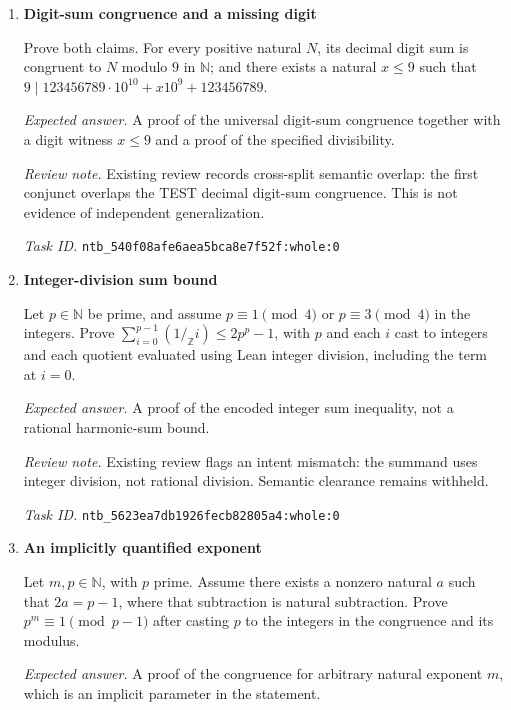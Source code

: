 \documentclass[11pt]{article}
\newcommand{\pth}[1]{\nolinkurl{#1}}
\begin{document}
\begin{enumerate}[label={DEV \arabic*.},leftmargin=4.5em,itemsep=1em]
\emph{Expected answer.} A proof of the integer congruence $p^n\equiv1\pmod{p-1}$ under the prime, exponent, and existential assumptions.

\emph{Task ID.} \pth{ntb_4678ae628e2cd00da60bb8e9:whole:0}

\item \textbf{Digit-sum congruence and a missing digit}\label{qn:dev:13}

Prove both claims. For every positive natural $N$, its decimal digit sum is congruent to $N$ modulo $9$ in $\mathbb N$; and there exists a natural $x\le9$ such that $9\mid123456789\cdot10^{10}+x10^9+123456789$.

\emph{Expected answer.} A proof of the universal digit-sum congruence together with a digit witness $x\le9$ and a proof of the specified divisibility.

\emph{Review note.} Existing review records cross-split semantic overlap: the first conjunct overlaps the TEST decimal digit-sum congruence. This is not evidence of independent generalization.

\emph{Task ID.} \pth{ntb_540f08afe6aea5bca8e7f52f:whole:0}

\item \textbf{Integer-division sum bound}\label{qn:dev:14}

Let $p\in\mathbb N$ be prime, and assume $p\equiv1\pmod4$ or $p\equiv3\pmod4$ in the integers. Prove $\sum_{i=0}^{p-1}(1\mathbin{/_{\mathbb Z}}i)\le2p^p-1$, with $p$ and each $i$ cast to integers and each quotient evaluated using Lean integer division, including the term at $i=0$.

\emph{Expected answer.} A proof of the encoded integer sum inequality, not a rational harmonic-sum bound.

\emph{Review note.} Existing review flags an intent mismatch: the summand uses integer division, not rational division. Semantic clearance remains withheld.

\emph{Task ID.} \pth{ntb_5623ea7db1926fecb82805a4:whole:0}

\item \textbf{An implicitly quantified exponent}\label{qn:dev:15}

Let $m,p\in\mathbb N$, with $p$ prime. Assume there exists a nonzero natural $a$ such that $2a=p-1$, where that subtraction is natural subtraction. Prove $p^m\equiv1\pmod{p-1}$ after casting $p$ to the integers in the congruence and its modulus.

\emph{Expected answer.} A proof of the congruence for arbitrary natural exponent $m$, which is an implicit parameter in the statement.


\end{enumerate}
\end{document}
